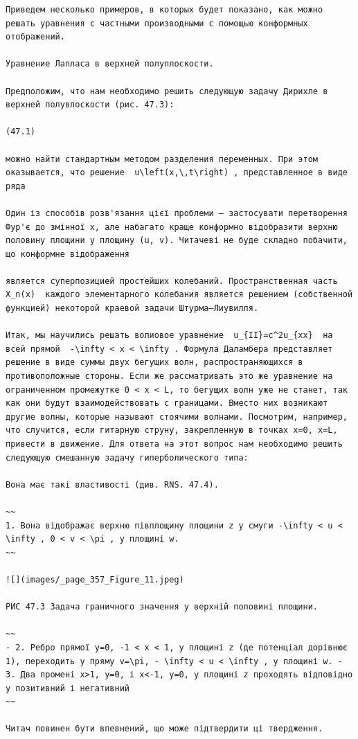 \documentclass[
  ukrainian,
]{article}
\begin{document}
\begin{verbatim}
Приведем несколько примеров, в которых будет показано, как можно решать уравнения с частными производными с помощью конформных отображений.

Уравнение Лапласа в верхней полуплоскости.

Предположим, что нам необходимо решить следующую задачу Дирихле в верхней полувлоскости (рис. 47.3):

(47.1)

можно найти стандартным методом разделения переменных. При этом оказывается, что решение  u\left(x,\,t\right) , представленное в виде ряда

Один із способів розв'язання цієї проблеми — застосувати перетворення Фур'є до змінної x, але набагато краще конформно відобразити верхню половину площини у площину (u, v). Читачеві не буде складно побачити, що конформне відображення

является суперпозицией простейших колебаний. Пространственная часть  X_n(x)  каждого элементарного колебания является решением (собственной функцией) некоторой краевой задачи Штурма—Лиувилля.

Итак, мы научились решать волиовое уравнение  u_{II}=c^2u_{xx}  на всей прямой  -\infty < x < \infty . Формула Даламбера представляет решение в виде суммы двух бегущих волн, распространяющихся в противоположные стороны. Если же рассматривать это же уравнение на ограниченном промежутке 0 < x < L, то бегущих волн уже не станет, так как они будут взаимодействовать с границами. Вместо них возникают другие волны, которые называют стоячими волнами. Посмотрим, например, что случится, если гитарную струну, закрепленную в точках x=0, x=L, привести в движение. Для ответа на этот вопрос нам необходимо решить следующую смешанную задачу гиперболического типа:

Вона має такі властивості (див. RNS. 47.4).

~~
1. Вона відображає верхню півплощину площини z у смуги -\infty < u < \infty , 0 < v < \pi , у площині w.
~~

![](images/_page_357_Figure_11.jpeg)

РИС 47.3 Задача граничного значення у верхній половині площини.

~~
- 2. Ребро прямої y=0, -1 < x < 1, у площині z (де потенціал дорівнює 1), переходить у пряму v=\pi, - \infty < u < \infty , у площині w. - 3. Два промені x>1, y=0, і x<-1, y=0, у площині z проходять відповідно у позитивний і негативний
~~

Читач повинен бути впевнений, що може підтвердити ці твердження.


\end{verbatim}
\end{document}
